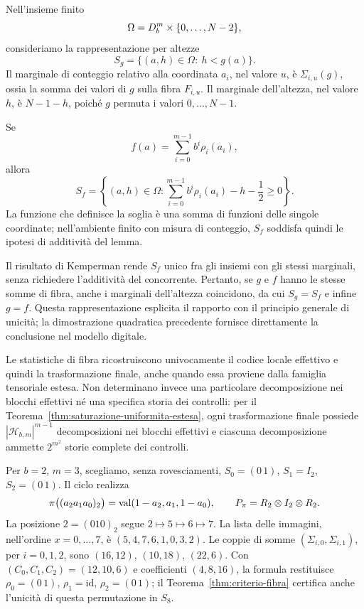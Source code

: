 Nell'insieme finito
\[
\Omega
=
D_b^m\times\{0,\ldots,N-2\},
\]
consideriamo la rappresentazione per altezze
\[
S_g
=
\{(a,h)\in\Omega:\ h<g(a)\}.
\]
Il marginale di conteggio relativo alla coordinata \(a_i\), nel valore
\(u\), è \(\Sigma_{i,u}(g)\), ossia la somma dei valori di \(g\) sulla
fibra \(F_{i,u}\). Il marginale dell'altezza, nel valore \(h\), è
\(N-1-h\), poiché \(g\) permuta i valori \(0,\ldots,N-1\).

Se
\[
f(a)=\sum_{i=0}^{m-1}b^i\rho_i(a_i),
\]
allora
\[
S_f
=
\left\{
(a,h)\in\Omega:
\sum_{i=0}^{m-1}b^i\rho_i(a_i)-h-\frac12\ge0
\right\}.
\]
La funzione che definisce la soglia è una somma di funzioni delle singole
coordinate; nell'ambiente finito con misura di conteggio, \(S_f\) soddisfa
quindi le ipotesi di additività del lemma.

Il risultato di Kemperman rende \(S_f\) unico fra gli insiemi con gli stessi
marginali, senza richiedere l'additività del concorrente. Pertanto, se \(g\)
e \(f\) hanno le stesse somme di fibra, anche i marginali dell'altezza
coincidono, da cui \(S_g=S_f\) e infine \(g=f\).
Questa rappresentazione esplicita il rapporto con il principio generale
di unicità; la dimostrazione quadratica precedente fornisce direttamente
la conclusione nel modello digitale.

	\begin{remark}
		Le statistiche di fibra ricostruiscono univocamente il codice locale
		effettivo e quindi la trasformazione finale, anche quando essa proviene
		dalla famiglia tensoriale estesa. Non determinano invece una particolare
		decomposizione nei blocchi effettivi né una specifica storia dei controlli:
		per il Teorema~\ref{thm:saturazione-uniformita-estesa}, ogni trasformazione
		finale possiede \(|\mathcal H_{b,m}|^{m-1}\) decomposizioni nei blocchi
		effettivi e ciascuna decomposizione ammette \(2^{m^2}\) storie complete dei
		controlli.
	\end{remark}

	\begin{example}
		Per \(b=2\), \(m=3\), scegliamo, senza rovesciamenti,
		\(S_0=(0\,1)\), \(S_1=I_2\), \(S_2=(0\,1)\). Il ciclo realizza
		\[
		\pi\bigl((a_2a_1a_0)_2\bigr)=\operatorname{val}(1-a_2,a_1,1-a_0),
		\qquad P_\pi=R_2\otimes I_2\otimes R_2.
		\]
		La posizione \(2=(010)_2\) segue \(2\mapsto5\mapsto6\mapsto7\).
		La lista delle immagini, nell'ordine \(x=0,\dots,7\), è
		\((5,4,7,6,1,0,3,2)\). Le coppie di somme
		\((\Sigma_{i,0},\Sigma_{i,1})\), per \(i=0,1,2\), sono
		\((16,12)\), \((10,18)\), \((22,6)\). Con
		\((C_0,C_1,C_2)=(12,10,6)\) e coefficienti \((4,8,16)\), la
		formula restituisce \(\rho_0=(0\,1)\), \(\rho_1=\mathrm{id}\),
		\(\rho_2=(0\,1)\); il Teorema~\ref{thm:criterio-fibra} certifica
		anche l'unicità di questa permutazione in \(S_8\).
	\end{example}

